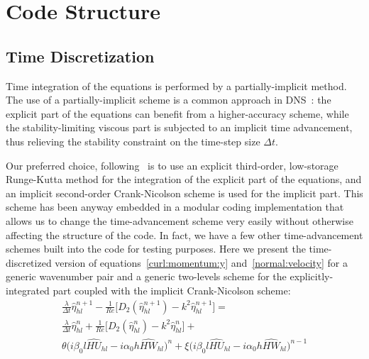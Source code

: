 \chapter{Code Structure}





\section{Time Discretization}
Time integration of the equations is performed by a partially-implicit method.
The use of a partially-implicit scheme is a common approach in DNS~\cite{kim_moin_moser}: the explicit part of the equations can benefit from a higher-accuracy scheme, while the stability-limiting viscous part is subjected to an implicit time advancement, thus relieving the stability constraint on the time-step size $	\Delta t$. \par
Our preferred choice, following~\cite{ns:quadrio}\cite{kim_moin_moser} is to use an explicit third-order, low-storage Runge-Kutta method for the integration of the explicit part of the equations, and an implicit second-order Crank-Nicolson scheme is used for the implicit part. This scheme has been anyway embedded in a modular coding implementation that allows us to change the time-advancement scheme very easily without otherwise affecting the structure of the code. In fact, we have a few other time-advancement schemes built into the code for testing purposes. Here we present the time-discretized version of equations~\ref{curl:momentum:y} and~\ref{normal:velocity} for a generic wavenumber pair and a generic two-levels scheme for the explicitly-integrated part coupled with the implicit Crank-Nicolson scheme:
\begin{multline}
\frac{\lambda}{\Delta t} \hat{\eta}_{hl}^{n+1} -\frac{1}{Re} \big[ D_{2} (\hat{\eta}_{hl}^{n+1}) - k^{2} \hat{\eta}_{hl}^{n+1} \big] = \\
\frac{\lambda}{\Delta t} \hat{\eta}_{hl}^{n} + \frac{1}{Re} \big[ D_{2} (\hat{\eta}_{hl}^{n}) - k^{2} \hat{\eta}_{hl}^{n} \big] + \\
\theta \big( i\beta_{0}l\widehat{HU}_{hl} - i\alpha_{0}h\widehat{HW}_{hl} \big)^{n} + \xi \big( i\beta_{0}l\widehat{HU}_{hl} - i\alpha_{0}h \widehat{HW}_{hl} \big)^{n-1}
\end{multline}




